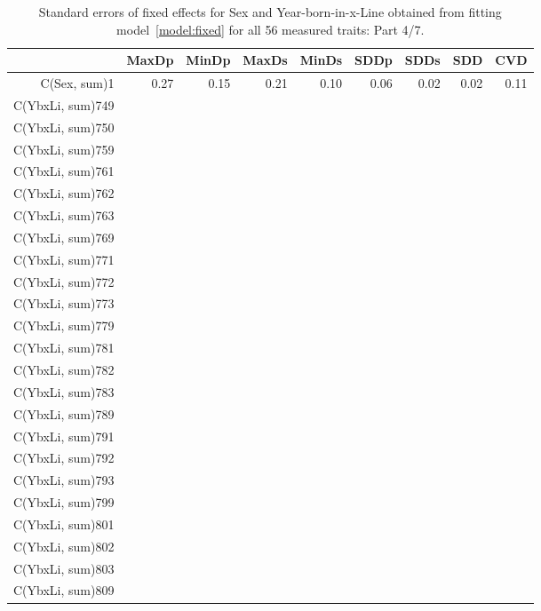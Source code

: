 \begin{table}[p]
\centering
\caption{Standard errors of fixed effects for Sex and Year-born-in-x-Line obtained from fitting model~\ref{model:fixed} for all 56 measured traits: Part 4/7.}
\label{tab:seb4}
\begin{tabular}{rrrrrrrrr}
  \hline
 & MaxDp & MinDp & MaxDs & MinDs & SDDp & SDDs & SDD & CVD \\ 
  \hline
C(Sex, sum)1 & 0.27 & 0.15 & 0.21 & 0.10 & 0.06 & 0.02 & 0.02 & 0.11 \\ 
  C(YbxLi, sum)749 &  &  &  &  &  &  &  &  \\ 
  C(YbxLi, sum)750 &  &  &  &  &  &  &  &  \\ 
  C(YbxLi, sum)759 &  &  &  &  &  &  &  &  \\ 
  C(YbxLi, sum)761 &  &  &  &  &  &  &  &  \\ 
  C(YbxLi, sum)762 &  &  &  &  &  &  &  &  \\ 
  C(YbxLi, sum)763 &  &  &  &  &  &  &  &  \\ 
  C(YbxLi, sum)769 &  &  &  &  &  &  &  &  \\ 
  C(YbxLi, sum)771 &  &  &  &  &  &  &  &  \\ 
  C(YbxLi, sum)772 &  &  &  &  &  &  &  &  \\ 
  C(YbxLi, sum)773 &  &  &  &  &  &  &  &  \\ 
  C(YbxLi, sum)779 &  &  &  &  &  &  &  &  \\ 
  C(YbxLi, sum)781 &  &  &  &  &  &  &  &  \\ 
  C(YbxLi, sum)782 &  &  &  &  &  &  &  &  \\ 
  C(YbxLi, sum)783 &  &  &  &  &  &  &  &  \\ 
  C(YbxLi, sum)789 &  &  &  &  &  &  &  &  \\ 
  C(YbxLi, sum)791 &  &  &  &  &  &  &  &  \\ 
  C(YbxLi, sum)792 &  &  &  &  &  &  &  &  \\ 
  C(YbxLi, sum)793 &  &  &  &  &  &  &  &  \\ 
  C(YbxLi, sum)799 &  &  &  &  &  &  &  &  \\ 
  C(YbxLi, sum)801 &  &  &  &  &  &  &  &  \\ 
  C(YbxLi, sum)802 &  &  &  &  &  &  &  &  \\ 
  C(YbxLi, sum)803 &  &  &  &  &  &  &  &  \\ 
  C(YbxLi, sum)809 &  &  &  &  &  &  &  &  \\ 

\end{tabular}
\end{table}
